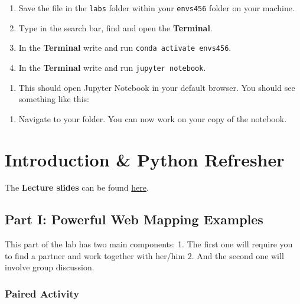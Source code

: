 \documentclass[
  letterpaper,
  DIV=11,
  numbers=noendperiod]{scrreprt}
\providecommand{\tightlist}{%
  \setlength{\itemsep}{0pt}\setlength{\parskip}{0pt}}\usepackage{longtable,booktabs,array}
\begin{document}
\begin{enumerate}
\def\labelenumi{\arabic{enumi}.}
\setcounter{enumi}{1}
\tightlist
\item
  Save the file in the \texttt{labs} folder within your \texttt{envs456}
  folder on your machine.
\item
  Type in the search bar, find and open the \textbf{Terminal}.
\item
  In the \textbf{Terminal} write and run
  \texttt{conda\ activate\ envs456}.
\item
  In the \textbf{Terminal} write and run \texttt{jupyter\ notebook}.
\end{enumerate}

\begin{enumerate}
\def\labelenumi{\arabic{enumi}.}
\setcounter{enumi}{5}
\tightlist
\item
  This should open Jupyter Notebook in your default browser. You should
  see something like this:
\end{enumerate}

\begin{enumerate}
\def\labelenumi{\arabic{enumi}.}
\setcounter{enumi}{6}
\tightlist
\item
  Navigate to your folder. You can now work on your copy of the
  notebook.
\end{enumerate}


\chapter{Introduction \& Python
Refresher}\label{introduction-python-refresher}

The \textbf{Lecture slides} can be found
\href{https://github.com/GDSL-UL/wma/raw/main/lectures/w01.html}{here}.

\section{Part I: Powerful Web Mapping
Examples}\label{part-i-powerful-web-mapping-examples}

This part of the lab has two main components: 1. The first one will
require you to find a partner and work together with her/him 2. And the
second one will involve group discussion.

\subsection{Paired Activity}\label{paired-activity}
\end{document}
